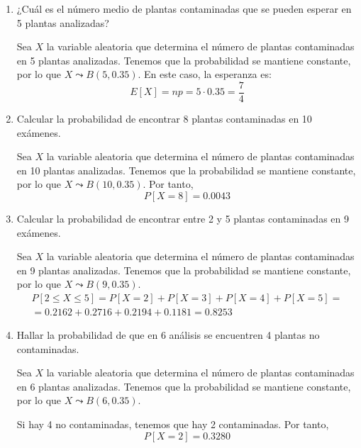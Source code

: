 \begin{ejercicio}
\begin{enumerate}
        \item ¿Cuál es el número medio de plantas contaminadas que se pueden esperar en 5 plantas analizadas?

        Sea $X$ la variable aleatoria que determina el número de plantas contaminadas en 5 plantas analizadas. Tenemos que la probabilidad se mantiene constante, por lo que $X\leadsto B(5,0.35)$. En este caso, la esperanza es:
        \begin{equation*}
            E[X]=np = 5\cdot 0.35 = \frac{7}{4}
        \end{equation*}
        
        \item Calcular la probabilidad de encontrar 8 plantas contaminadas en 10 exámenes.

        Sea $X$ la variable aleatoria que determina el número de plantas contaminadas en 10 plantas analizadas. Tenemos que la probabilidad se mantiene constante, por lo que $X\leadsto B(10,0.35)$. Por tanto,
        \begin{equation*}
            P[X=8]=0.0043
        \end{equation*}
        
        \item Calcular la probabilidad de encontrar entre 2 y 5 plantas contaminadas en 9 exámenes.

        Sea $X$ la variable aleatoria que determina el número de plantas contaminadas en 9 plantas analizadas. Tenemos que la probabilidad se mantiene constante, por lo que $X\leadsto B(9,0.35)$.
        \begin{multline*}
            P[2\leq X\leq 5] = P[X=2] + P[X=3] + P[X=4] + P[X=5]
            =\\= 0.2162 + 0.2716 + 0.2194 + 0.1181 = 0.8253
        \end{multline*}

        
        \item Hallar la probabilidad de que en 6 análisis se encuentren 4 plantas no contaminadas.

        Sea $X$ la variable aleatoria que determina el número de plantas contaminadas en 6 plantas analizadas. Tenemos que la probabilidad se mantiene constante, por lo que $X\leadsto B(6,0.35)$.
        
        Si hay 4 no contaminadas, tenemos que hay 2 contaminadas. Por tanto,
        \begin{equation*}
            P[X=2]=0.3280
        \end{equation*}
        
    \end{enumerate}
\end{ejercicio}



